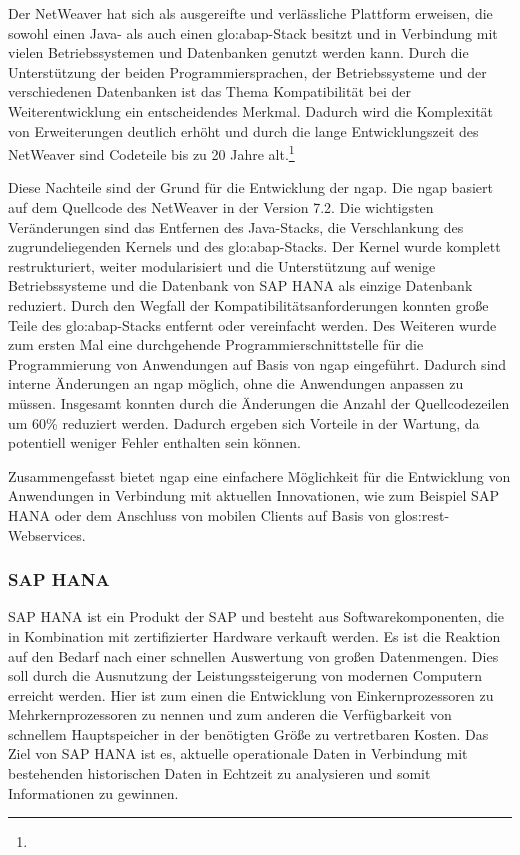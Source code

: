 \begin{onehalfspacing}
Der \gls{NetWeaver} hat sich als ausgereifte und verlässliche Plattform erweisen, die sowohl einen Java- als auch einen \gls{glo:abap}-Stack besitzt und in Verbindung mit vielen Betriebssystemen und Datenbanken genutzt werden kann. Durch die Unterstützung der beiden Programmiersprachen, der Betriebssysteme und der verschiedenen Datenbanken ist das Thema Kompatibilität bei der Weiterentwicklung ein entscheidendes Merkmal. Dadurch wird die Komplexität von Erweiterungen deutlich erhöht und durch die lange Entwicklungszeit des \gls{NetWeaver} sind Codeteile bis zu 20 Jahre alt.\footnote{ }

Diese Nachteile sind der Grund für die Entwicklung der \gls{ngap}. Die \gls{ngap} basiert auf dem Quellcode des \gls{NetWeaver} in der Version 7.2. Die wichtigsten Veränderungen sind das Entfernen des Java-Stacks, die Verschlankung des zugrundeliegenden Kernels und des \gls{glo:abap}-Stacks. Der Kernel wurde komplett restrukturiert, weiter modularisiert und die Unterstützung auf wenige Betriebssysteme und die Datenbank von SAP HANA als einzige Datenbank reduziert. Durch den Wegfall der Kompatibilitätsanforderungen konnten große Teile des \gls{glo:abap}-Stacks entfernt oder vereinfacht werden. Des Weiteren wurde zum ersten Mal eine durchgehende Programmierschnittstelle für die Programmierung von Anwendungen auf Basis von \gls{ngap} eingeführt. Dadurch sind interne Änderungen an \gls{ngap} möglich, ohne die Anwendungen anpassen zu müssen. Insgesamt konnten durch die Änderungen die Anzahl der Quellcodezeilen um 60\% reduziert werden. Dadurch ergeben sich Vorteile in der Wartung, da potentiell weniger Fehler enthalten sein können.

Zusammengefasst bietet \gls{ngap} eine einfachere Möglichkeit für die Entwicklung von Anwendungen in Verbindung mit aktuellen Innovationen, wie zum Beispiel SAP HANA oder dem Anschluss von mobilen Clients auf Basis von \gls{glos:rest}-Webservices.

\subsubsection{SAP HANA}
SAP HANA ist ein Produkt der SAP und besteht aus Softwarekomponenten, die in Kombination mit zertifizierter Hardware verkauft werden. Es ist die Reaktion auf den Bedarf nach einer schnellen Auswertung von großen Datenmengen. Dies soll durch die Ausnutzung der Leistungssteigerung von modernen Computern erreicht werden. Hier ist zum einen die Entwicklung von Einkernprozessoren zu Mehrkernprozessoren zu nennen und zum anderen die Verfügbarkeit von schnellem Hauptspeicher in der benötigten Größe zu vertretbaren Kosten. Das Ziel von SAP HANA ist es, aktuelle operationale Daten in Verbindung mit bestehenden historischen Daten in Echtzeit zu analysieren und somit Informationen zu gewinnen.


\end{onehalfspacing}
